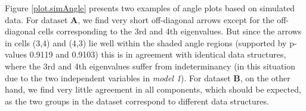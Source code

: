\documentclass[]{interact}
\theoremstyle{plain}%
\theoremstyle{definition}
\theoremstyle{remark}
\begin{document}

Figure \ref{plot.simAngle} presents two examples of angle plots based on simulated data. For dataset $\mathbf{A}$, we find very short off-diagonal arrows except for the off-diagonal cells corresponding to the 3rd and 4th eigenvalues. But since the arrows in cells (3,4) and (4,3) lie well within the shaded angle regions (supported by p-values 0.9119 and 0.9103) this is in agreement with identical data structures, where the 3rd and 4th eigenvalues suffer from indeterminancy (in this situation due to the two independent variables in \emph{model 1}). For dataset $\mathbf{B}$, on the other hand, we find very little agreement in all components, which should be expected, as the two groups in the dataset correspond to different data structures.
\end{document}
